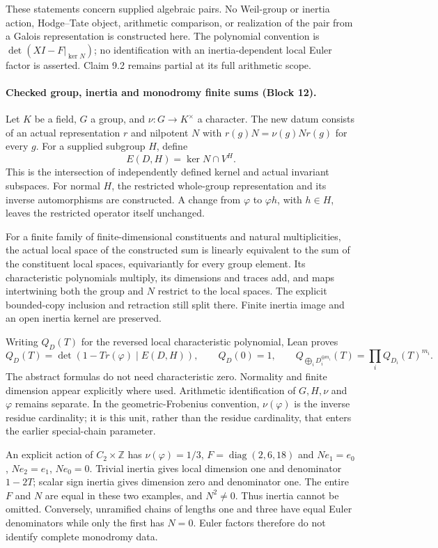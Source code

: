 \documentclass[11pt]{article}
\theoremstyle{definition}
\theoremstyle{remark}
\begin{document}
These statements concern supplied algebraic pairs. No Weil-group or inertia
action, Hodge--Tate object, arithmetic comparison, or realization of the pair
from a Galois representation is constructed here. The polynomial convention is
$\det(XI-F|_{\ker N})$; no identification with an inertia-dependent local
Euler factor is asserted. Claim 9.2 remains partial at its full arithmetic scope.


\paragraph{Checked group, inertia and monodromy finite sums (Block 12).}
Let $K$ be a field, $G$ a group, and $\nu:G\to K^\times$ a character.
The new datum consists of an actual representation $r$ and nilpotent $N$ with
$r(g)N=\nu(g)Nr(g)$ for every $g$. For a supplied subgroup $H$, define
\[
 E(D,H)=\ker N\cap V^H.
\]
This is the intersection of independently defined kernel and actual invariant
subspaces. For normal $H$, the restricted whole-group representation and its
inverse automorphisms are constructed. A change from $\varphi$ to $\varphi h$,
with $h\in H$, leaves the restricted operator itself unchanged.

For a finite family of finite-dimensional constituents and natural multiplicities,
the actual local space of the constructed sum is linearly equivalent to the sum of the constituent local spaces, equivariantly
for every group element. Its characteristic polynomials multiply, its dimensions
and traces add, and maps intertwining both the group and $N$ restrict to the
local spaces. The explicit bounded-copy inclusion and retraction still split
there. Finite inertia image and an open inertia kernel are preserved.

Writing $Q_D(T)$ for the reversed local characteristic polynomial, Lean proves
\[
 Q_D(T)=\det(1-T r(\varphi)\mid E(D,H)),\qquad Q_D(0)=1,
 \qquad
 Q_{\bigoplus_iD_i^{\oplus m_i}}(T)=\prod_iQ_{D_i}(T)^{m_i}.
\]
The abstract formulas do not need characteristic zero. Normality and finite
dimension appear explicitly where used. Arithmetic identification of $G,H,\nu$
and $\varphi$ remains separate. In the geometric-Frobenius convention,
$\nu(\varphi)$ is the inverse residue cardinality; it is this unit, rather than
the residue cardinality, that enters the earlier special-chain parameter.

An explicit action of $C_2\times\mathbb Z$ has $\nu(\varphi)=1/3$,
$F=\operatorname{diag}(2,6,18)$ and $Ne_1=e_0$, $Ne_2=e_1$, $Ne_0=0$.
Trivial inertia gives local dimension one and denominator $1-2T$; scalar sign
inertia gives dimension zero and denominator one. The entire $F$ and $N$ are
equal in these two examples, and $N^2\ne0$. Thus inertia cannot be omitted.
Conversely, unramified chains of lengths one and three have equal Euler
denominators while only the first has $N=0$. Euler factors therefore do not
identify complete monodromy data.
\end{document}
